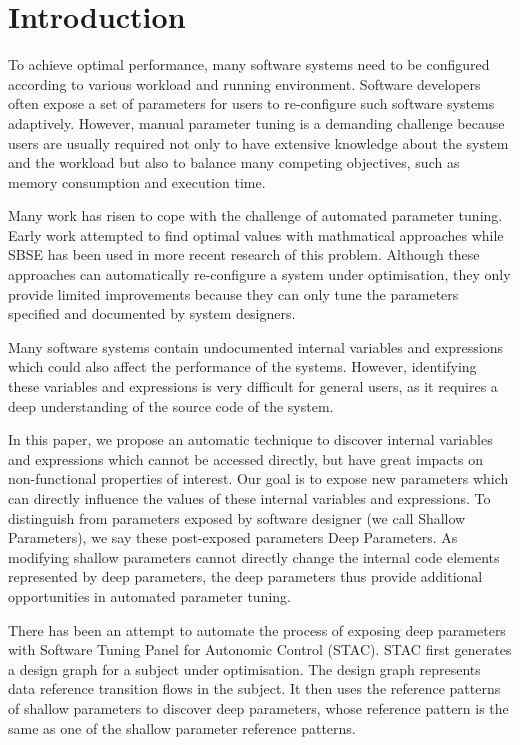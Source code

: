
\section{Introduction}

To achieve optimal performance, many software systems need to be configured according to various workload and running environment. 
Software developers often expose a set of parameters for users to re-configure such software systems adaptively.
However, manual parameter tuning is a demanding challenge because users are usually required not only to have extensive knowledge about the system and the workload but also to balance many competing objectives, such as memory consumption and execution time.

Many work has risen to cope with the challenge of automated parameter tuning\cite{Hoffmann:2011:DKR:1961296.1950390}. Early work attempted to find optimal values with mathmatical approaches \cite{Vuduc01statisticalmodels,autotuning,Whaley:1998:ATL:509058.509096,Tapus:2002:AHT:762761.762771} while SBSE\cite{Harman:2007:CSF:1253532.1254729} has been used in more recent research \cite{hutter2009paramils,arcuri-ssbse-2011,Hoffmann:2011:DKR:1961296.1950390} of this problem. Although these approaches can automatically re-configure a system under optimisation, they only provide limited improvements because they can only tune the parameters specified and documented by system designers.

Many software systems contain undocumented internal variables and expressions which could also affect the performance of the systems. However, identifying these variables and expressions is very difficult for general users, as it requires a deep understanding of the source code of the system. 

In this paper, we propose an automatic technique to discover internal variables and expressions which cannot be accessed directly, but have great impacts on non-functional properties of interest. Our goal is to expose new parameters which can directly influence the values of these internal variables and expressions. To distinguish from parameters exposed by software designer (we call Shallow Parameters), we say these post-exposed parameters Deep Parameters. As modifying shallow parameters cannot directly change the internal code elements represented by deep parameters, the deep parameters thus provide additional opportunities in automated parameter tuning.

There has been an attempt to automate the process of exposing deep parameters with Software Tuning Panel for Autonomic Control (STAC)\cite{Brake:2008:ADS:1370018.1370031}. STAC first generates a design graph for a subject under optimisation. The design graph represents data reference transition flows in the subject. It then uses the reference patterns of shallow parameters to discover deep parameters, whose reference pattern is the same as one of the shallow parameter reference patterns. 


